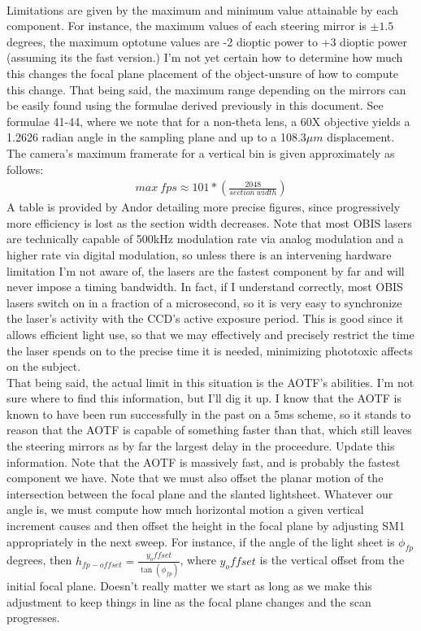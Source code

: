 \\
Limitations are given by the maximum and minimum value attainable by each component. For instance, the maximum values of each steering mirror is $\pm 1.5$ degrees, the maximum optotune values are -2 dioptic power to +3 dioptic power (assuming its the fast version.) I'm not yet certain how to determine how much this changes the focal plane placement of the object-unsure of how to compute this change. That being said, the maximum range depending on the mirrors can be easily found using the formulae derived previously in this document. See formulae 41-44, where we note that for a non-theta lens, a 60X objective yields a 1.2626 radian angle in the sampling plane and up to a 108.3$\mu m$ displacement.
The camera's maximum framerate for a vertical bin is given approximately as follows:
\begin{gather}
    max \ fps \approx 101 * (\frac{2048}{section\ width})
\end{gather}
A table is provided by Andor detailing more precise figures, since progressively more efficiency is lost as the section width decreases.
Note that most OBIS lasers are technically capable of 500kHz modulation rate via analog modulation and a higher rate via digital modulation, so unless there is an intervening hardware limitation I'm not aware of, the lasers are the fastest component by far and will never impose a timing bandwidth. In fact, if I understand correctly, most OBIS lasers switch on in a fraction of a microsecond, so it is very easy to synchronize the laser's activity with the CCD's active exposure period. This is good since it allows efficient light use, so that we may effectively and precisely restrict the time the laser spends on to the precise time it is needed, minimizing phototoxic affects on the subject.\\
That being said, the actual limit in this situation is the AOTF's abilities. I'm not sure where to find this information, but I'll dig it up. I know that the AOTF is known to have been run successfully in the past on a 5ms scheme, so it stands to reason that the AOTF is capable of something faster than that, which still leaves the steering mirrors as by far the largest delay in the proceedure.
Update this information. Note that the AOTF is massively fast, and is probably the fastest component we have.
\newpage
Note that we must also offset the planar motion of the intersection between the focal plane and the slanted lightsheet. Whatever our angle is, we must compute how much horizontal motion a given vertical increment causes and then offset the height in the focal plane by adjusting SM1 appropriately in the next sweep. For instance, if the angle of the light sheet is $\phi_{fp}$ degrees, then $h_{fp-offset}= \frac{y_offset}{\tan(\phi_{fp})}$, where $y_offset$ is the vertical offset from the initial focal plane. Doesn't really matter we start as long as we make this adjustment to keep things in line as the focal plane changes and the scan progresses.
